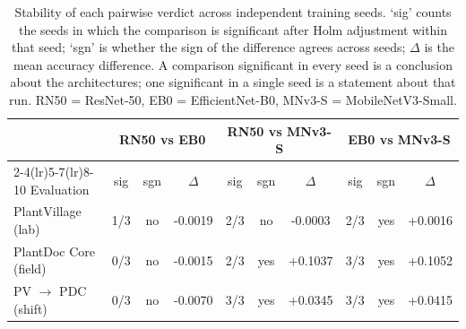 \begin{table}[htbp]
\caption{Stability of each pairwise verdict across independent training seeds. `sig' counts the seeds in which the comparison is significant after Holm adjustment within that seed; `sgn' is whether the sign of the difference agrees across seeds; $\Delta$ is the mean accuracy difference. A comparison significant in every seed is a conclusion about the architectures; one significant in a single seed is a statement about that run. RN50 = ResNet-50, EB0 = EfficientNet-B0, MNv3-S = MobileNetV3-Small.}
\label{tab:significance-across-seeds-compact}
\scriptsize
\centering
\setlength{\tabcolsep}{5pt}
\begin{tabular}{lccccccccc}
\toprule
 & \multicolumn{3}{c}{RN50 vs EB0} & \multicolumn{3}{c}{RN50 vs MNv3-S} & \multicolumn{3}{c}{EB0 vs MNv3-S} \\
\cmidrule(lr){2-4}\cmidrule(lr){5-7}\cmidrule(lr){8-10}
Evaluation & sig & sgn & $\Delta$ & sig & sgn & $\Delta$ & sig & sgn & $\Delta$ \\
\midrule
PlantVillage (lab) & 1/3 & no & -0.0019 & 2/3 & no & -0.0003 & 2/3 & yes & +0.0016 \\
PlantDoc Core (field) & 0/3 & no & -0.0015 & 2/3 & yes & +0.1037 & 3/3 & yes & +0.1052 \\
PV $\rightarrow$ PDC (shift) & 0/3 & no & -0.0070 & 3/3 & yes & +0.0345 & 3/3 & yes & +0.0415 \\
\bottomrule
\end{tabular}
\end{table}
